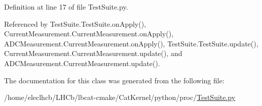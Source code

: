 Definition at line 17 of file Test\+Suite.\+py.



Referenced by Test\+Suite.\+Test\+Suite.\+on\+Apply(), Current\+Measurement.\+Current\+Measurement.\+on\+Apply(), A\+D\+C\+Measurement.\+Current\+Measurement.\+on\+Apply(), Test\+Suite.\+Test\+Suite.\+update(), Current\+Measurement.\+Current\+Measurement.\+update(), and A\+D\+C\+Measurement.\+Current\+Measurement.\+update().



The documentation for this class was generated from the following file\+:\begin{DoxyCompactItemize}
\item 
/home/eleclhcb/\+L\+H\+Cb/lbcat-\/cmake/\+Cat\+Kernel/python/proc/\hyperlink{TestSuite_8py}{Test\+Suite.\+py}\end{DoxyCompactItemize}
